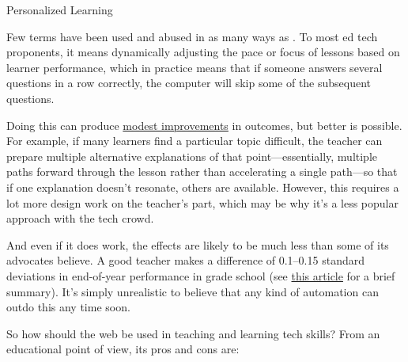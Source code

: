 \begin{callout}{Personalized Learning}

  Few terms have been used and abused in as many ways as
  .  To most
  ed tech proponents, it means dynamically adjusting the pace or focus
  of lessons based on learner performance, which in practice means
  that if someone answers several questions in a row correctly, the
  computer will skip some of the subsequent questions.

  Doing this can produce
  \href{https://www.rand.org/pubs/research_briefs/RB9994.html}{modest
    improvements} in outcomes, but better is possible. For example, if
  many learners find a particular topic difficult, the teacher can
  prepare multiple alternative explanations of that
  point---essentially, multiple paths forward through the lesson
  rather than accelerating a single path---so that if one explanation
  doesn't resonate, others are available.  However, this requires a
  lot more design work on the teacher's part, which may be why it's
  a less popular approach with the tech crowd.

  And even if it does work, the effects are likely to be much less
  than some of its advocates believe.  A good teacher makes a
  difference of 0.1--0.15 standard deviations in end-of-year
  performance in grade school \cite{Chet2014} (see
  \href{http://educationnext.org/in-schools-teacher-quality-matters-most-coleman/}{this
    article} for a brief summary).  It's simply unrealistic to believe
  that any kind of automation can outdo this any time soon.

\end{callout}

So how should the web be used in teaching and learning tech skills?
From an educational point of view, its pros and cons are:

